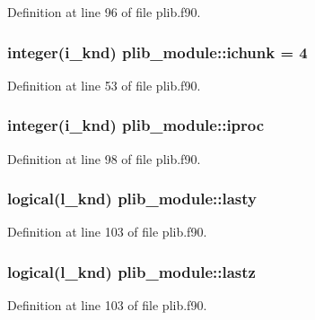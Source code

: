 Definition at line 96 of file plib.\-f90.

\hypertarget{classplib__module_a0982ec611aac37b53db96a8266ff5c48}{
\subsubsection[{ichunk}]{\setlength{\rightskip}{0pt plus 5cm}integer(i\-\_\-knd) plib\-\_\-module\-::ichunk = 4}}\label{classplib__module_a0982ec611aac37b53db96a8266ff5c48}


Definition at line 53 of file plib.\-f90.

\hypertarget{classplib__module_a20a10200b84fc53b3f9703d080eb4f41}{
\subsubsection[{iproc}]{\setlength{\rightskip}{0pt plus 5cm}integer(i\-\_\-knd) plib\-\_\-module\-::iproc}}\label{classplib__module_a20a10200b84fc53b3f9703d080eb4f41}


Definition at line 98 of file plib.\-f90.

\hypertarget{classplib__module_ac8204e5b33211c1fe40e991a11d63f95}{
\subsubsection[{lasty}]{\setlength{\rightskip}{0pt plus 5cm}logical(l\-\_\-knd) plib\-\_\-module\-::lasty}}\label{classplib__module_ac8204e5b33211c1fe40e991a11d63f95}


Definition at line 103 of file plib.\-f90.

\hypertarget{classplib__module_a5d6addca95cdb6299949d278355bed3b}{
\subsubsection[{lastz}]{\setlength{\rightskip}{0pt plus 5cm}logical(l\-\_\-knd) plib\-\_\-module\-::lastz}}\label{classplib__module_a5d6addca95cdb6299949d278355bed3b}


Definition at line 103 of file plib.\-f90.

